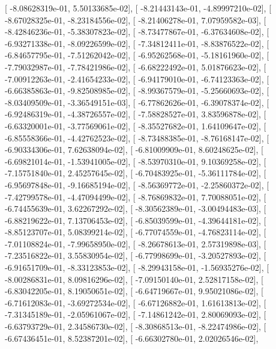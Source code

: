\documentclass{article}
\begin{document}
       [ -8.08628319e-01,   5.50133685e-02],
       [ -8.21443143e-01,  -4.89997210e-02],
       [ -8.67028325e-01,  -8.23184556e-02],
       [ -8.21406278e-01,   7.07959582e-03],
       [ -8.42846236e-01,  -5.38307823e-02],
       [ -8.73477867e-01,  -6.37634608e-02],
       [ -6.93271338e-01,  -8.09226599e-02],
       [ -7.34812411e-01,  -8.83876522e-02],
       [ -6.84657795e-01,  -7.51262042e-02],
       [ -6.95262568e-01,  -5.18161960e-02],
       [ -7.79032987e-01,  -7.78421986e-02],
       [ -6.68222492e-01,   5.01876623e-02],
       [ -7.00912263e-01,  -2.41654233e-02],
       [ -6.94179010e-01,  -6.74123363e-02],
       [ -6.66385863e-01,  -9.82508985e-02],
       [ -8.99367579e-01,  -5.25660693e-02],
       [ -8.03409509e-01,  -3.36549151e-03],
       [ -6.77862626e-01,  -6.39078374e-02],
       [ -6.92486319e-01,  -4.38726557e-02],
       [ -7.58828527e-01,   3.83596878e-02],
       [ -6.63320001e-01,  -3.77569061e-02],
       [ -8.35527682e-01,   1.64109647e-02],
       [ -6.85558366e-01,  -4.42762523e-02],
       [ -8.73488385e-01,  -8.76168147e-02],
       [ -6.90334306e-01,   7.62638094e-02],
       [ -6.81009909e-01,   8.60248625e-02],
       [ -6.69821014e-01,  -1.53941005e-02],
       [ -8.53970310e-01,   9.10369258e-02],
       [ -7.15751840e-01,   2.45257645e-02],
       [ -6.70483925e-01,  -5.36111784e-02],
       [ -6.95697848e-01,  -9.16685194e-02],
       [ -8.56369772e-01,  -2.25860372e-02],
       [ -7.42799578e-01,  -4.47094499e-02],
       [ -8.76869832e-01,   7.70088051e-02],
       [ -6.74455639e-01,   3.62267292e-02],
       [ -8.30562389e-01,  -3.00494483e-03],
       [ -6.88219622e-01,   7.13706453e-02],
       [ -6.85039599e-01,  -4.39644181e-02],
       [ -8.85123707e-01,   5.08399214e-02],
       [ -6.77074559e-01,  -4.76823114e-02],
       [ -7.01108824e-01,  -7.99658950e-02],
       [ -8.26678613e-01,   2.57319898e-03],
       [ -7.23516822e-01,   3.55830954e-02],
       [ -6.77998699e-01,  -3.20527893e-02],
       [ -6.91651709e-01,  -8.33123853e-02],
       [ -8.29943158e-01,  -1.56935276e-02],
       [ -8.00286831e-01,   8.09816296e-02],
       [ -7.09150140e-01,   2.52817158e-02],
       [ -6.83042205e-01,   8.19050651e-02],
       [ -6.64719667e-01,   9.95021086e-02],
       [ -6.71612083e-01,  -3.69272534e-02],
       [ -6.67126882e-01,   1.61613813e-02],
       [ -7.31345189e-01,  -2.05961067e-02],
       [ -7.14861242e-01,   2.80069093e-02],
       [ -6.63793729e-01,   2.34586730e-02],
       [ -8.30868513e-01,  -8.22474986e-02],
       [ -6.67436451e-01,   8.52387201e-02],
       [ -6.66302780e-01,   2.02026546e-02],
\end{document}
